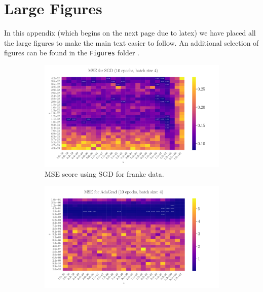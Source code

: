 \documentclass[%
reprint,s
amsmath,amssymb,
aps,
]{revtex4-2}
\begin{document}
\appendix
\section{Large Figures}
\label{Appendix:A}
In this appendix (which begins on the next page due to latex) we have placed all the large figures to make the main text easier to follow. An additional selection of figures can be found in the \texttt{Figures} folder \cite{extrafigures}.


\begin{figure}
	\begin{subfigure}{0.41\textwidth}
		\includegraphics[width=\textwidth]{Figures/LinRegSGD_25x25_epoch10_batchS4.pdf}
		\caption{MSE score using SGD for franke data.}
		\label{fig:LinReg25x25_epoch10_bacthS50}
	\end{subfigure}
	\hfill
	\begin{subfigure}{0.41\textwidth}
		\includegraphics[width=\textwidth]{Figures/LinRegAdaGrad_25x25_epoch10_batchS4.pdf}

\end{subfigure}
\end{figure}
\end{document}
